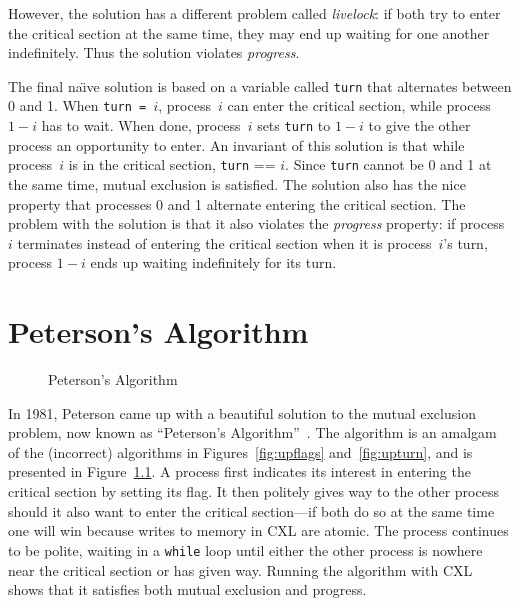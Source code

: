 \documentclass{report}
\newenvironment{code}{
\tcolorbox
}{
\endtcolorbox
}
\begin{document}
However, the solution has a different problem called \emph{livelock}:
if both try to enter the critical section at the same time, they may
end up waiting for one another indefinitely.  Thus the solution
violates \emph{progress}.

The final na\"{\i}ve solution is based on a variable called \texttt{turn}
that alternates between 0 and 1.  When \texttt{turn = $i$}, process~$i$ can
enter the critical section, while process $1-i$ has to wait.  When done,
process~$i$ sets \texttt{turn} to $1-i$ to give the other process an
opportunity to enter.
An invariant of this solution is that while process~$i$ is in the critical
section, \texttt{turn} == $i$.
Since \texttt{turn} cannot be 0 and 1 at
the same time, mutual exclusion is satisfied.
The solution also has the nice property that
processes 0 and 1 alternate entering the critical section.
The problem with the solution is
that it also violates the \emph{progress} property:
if process~$i$ terminates instead of entering the critical section when it
is process~$i$'s turn, process $1-i$ ends up waiting indefinitely for its
turn.

\chapter{Peterson's Algorithm}
\label{ch:peterson}

\begin{figure}
\begin{code}
\end{code}
\caption{Peterson's Algorithm}
\label{fig:peterson}
\end{figure}

In 1981, Peterson came up with a beautiful solution to the mutual exclusion
problem, now known as ``Peterson's Algorithm''~\cite{Peterson81}.
The algorithm is an amalgam of the (incorrect) algorithms in
Figures~\ref{fig:upflags} and~\ref{fig:upturn}, and is presented
in Figure~\ref{fig:peterson}.
A process first indicates its interest in entering the critical section
by setting its flag.
It then politely gives way to the other process should it also want to
enter the critical section---if both do so at the same time one will
win because writes to memory in CXL are atomic.
The process continues to be polite, waiting in a \texttt{while} loop
until either the other process is nowhere near the critical section
or has given way.
Running the algorithm with CXL shows that it satisfies both mutual
exclusion and progress.
\end{document}
